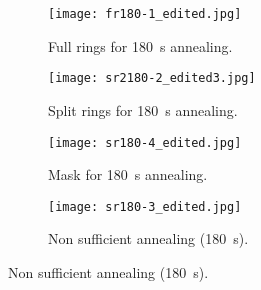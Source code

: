 \captionsetup{
    singlelinecheck=false,
    justification=justified
    }
\begin{figure}[htbp]
\begin{subfigure}{0.48\textwidth}
    \texttt{[image: fr180-1\_edited.jpg]}
    \caption[justification=raggedright]{
        Full rings for \SI{180}{\second} annealing.
        }
    \label{fig:sem-fr1}
\end{subfigure}
\hfill
\begin{subfigure}{0.48\textwidth}
    \texttt{[image: sr2180-2\_edited3.jpg]}
    \caption{
        Split rings for \SI{180}{\second} annealing.
    }
    \label{fig:sem-sr1}
\end{subfigure}

\begin{subfigure}{0.48\textwidth}
    \texttt{[image: sr180-4\_edited.jpg]}
    \caption{
        Mask for \SI{180}{\second} annealing.
    }
    \label{fig:sem-mask}
\end{subfigure}
\hfill
\begin{subfigure}{0.48\textwidth}
    \texttt{[image: sr180-3\_edited.jpg]}
    \caption{
        Non sufficient annealing (\SI{180}{\second}).
    }
    \label{fig:sem-nsa}
\end{subfigure}
\end{figure}